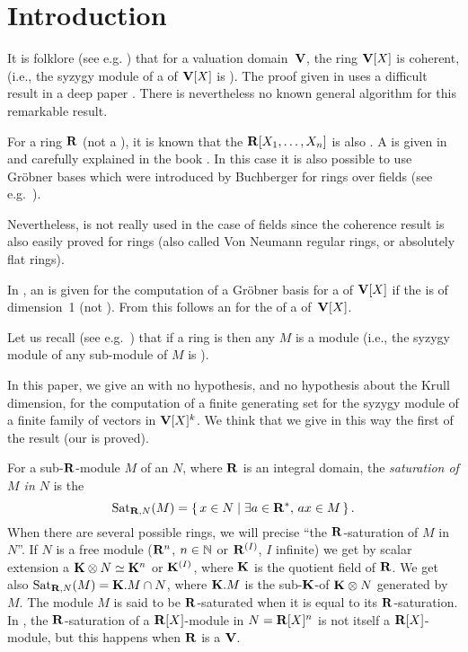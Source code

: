 
\section*{Introduction} \label{sec Introduction}


It is folklore (see e.g. \cite[Glaz, Th. 7.3.3]{Glaz}) that for a valuation domain~$\mathbf{V}$, the ring $\mathbf{V}[X]$ is coherent, (i.e., the syzygy module of a \itf of $\mathbf{V}[X]$ is \tf).
The proof given in \cite{Glaz} uses a difficult result in a deep paper  \cite{GR}.
There is nevertheless no known  general  algorithm  for this remarkable result.

For a \noe \coh ring $\mathbf{R}$ (not \ncrt a \ddv),
it is known that the \pol \ri $\mathbf{R}[X_1,\dots,X_n]$ is also \noe \coh.
A \prco is given in \cite{ric74}
and carefully explained in the book \citealt*{MRR}.
In this case it is also possible to use Gröbner bases which were introduced by  Buchberger for \pol rings over fields
(see e.g.\ \cite{Lou,HY,Y}).

Nevertheless,  \noet is not really used in the case of fields since the coherence result
is also easily proved for \zedr rings
(also called Von Neumann regular rings, or absolutely flat rings).



In \citealt*{LSY}, an \algo is given for the computation of a Gröbner basis for a \itf of $\mathbf{V}[X]$ if the \ddv is of dimension~1
(not \ncrt \noe).
From this  follows an \algo for the \cohc of a \itf of~$\mathbf{V}[X]$.

Let us recall (see e.g.\ \citealt*{MRR}) that if a ring is \coh then any \mpf $M$ is a \coh module
(i.e., the syzygy module of any \tf sub-module of $M$ is \tf).


In this paper, we give an \algo with no \noe hypothesis, and no hypothesis about the Krull dimension,
for the computation of a finite generating set for the syzygy module of a finite family of vectors in $\mathbf{V}[X]^k$.
We think that we give in this way the first \prco of the result
(our \algo is \cot proved).

For a sub-$\mathbf{R}$-module $M$ of an  \Rmo $N$, where  $\mathbf{R}$
is an integral domain, the \textsl{saturation of $M$ in $N$} is the \Rmo
\[\mathrm{Sat}_{\mathbf{R},N}(M)=\left\{{\,x\in N\mid\exists a\in \mathbf{R}^*,\,ax\in M\,}\right\}.
\]
When there are several possible rings, we will precise ``the $\mathbf{R}$-saturation of $M$ in $N$''.
If  $N$
is a free module ($\mathbf{R}^n $, $n\in \mathbb{N}$ or $\mathbf{R}^{(I)}$, $I$ infinite)
we get by scalar extension a \Kev $\mathbf{K}\otimes N\simeq\mathbf{K}^n $ or $\mathbf{K}^{(I)}$, where $\mathbf{K}$ is the quotient field of $\mathbf{R}$. We get also  $\mathrm{Sat}_{\mathbf{R},N}(M)=\mathbf{K}.M\cap N$,
where  $\mathbf{K}.M$ is the sub-$\mathbf{K}$-\evc of $\mathbf{K}\otimes N$  generated by $M$.
The module $M$ is said to be  $\mathbf{R}$-saturated when it is equal to its $\mathbf{R}$-saturation.
In \gnl, the $\mathbf{R}$-saturation of a \tf $\mathbf{R}[X]$-module in $N=\mathbf{R}[X]^n $ is not itself a \tf $\mathbf{R}[X]$-module,
but this happens when $\mathbf{R}$ is a \ddv $\mathbf{V}$.

